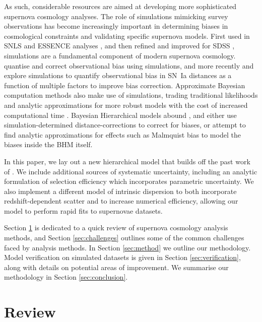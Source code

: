 \documentclass[twocolumn,trackchanges,tighten]{aastex62}
\begin{document}
As such, considerable resources are aimed at developing more sophisticated supernova cosmology analyses. The role of simulations mimicking survey observations has become increasingly important in determining biases in cosmological constraints and validating specific supernova models. First used in SNLS \citep{Astier2006} and ESSENCE analyses \citep{Wood-Vasey2007}, and then refined and improved for SDSS \citep{Kessler2009}, simulations are a fundamental component of modern supernova cosmology.  \citet{Betoule2014} quantise and correct observational bias using simulations, and more recently \citet{Scolnic2016} and \citet{Kessler2017} explore simulations to quantify observational bias in SN~Ia distances as a function of multiple factors to improve bias correction. Approximate Bayesian computation methods also make use of simulations, trading traditional likelihoods and analytic approximations for more robust models with the cost of increased computational time \citep{Weyant2013, Jennings2016}. Bayesian Hierarchical models abound \citep{Mandel2009, March2011, March2014, Rubin2015, Shariff2016, Roberts2017}, and either use simulation-determined distance-corrections to correct for biases, or attempt to find analytic approximations for effects such as Malmquist bias to model the biases inside the BHM itself.



In this paper, we lay out a new hierarchical model that builds off the past work of \citet{Rubin2015}. We include additional sources of systematic uncertainty, including an analytic formulation of selection efficiency which incorporates parametric uncertainty. We also implement a different model of intrinsic dispersion to both incorporate redshift-dependent scatter and to increase numerical efficiency, allowing our model to perform rapid fits to supernovae datasets.

Section \ref{sec:review} is dedicated to a quick review of supernova cosmology analysis methods, and Section \ref{sec:challenges} outlines some of the common challenges faced by analysis methods. In Section \ref{sec:method} we outline our methodology. Model verification on simulated datasets is given in Section \ref{sec:verification}, along with details on potential areas of improvement. We summarise our methodology in Section \ref{sec:conclusion}.



\section{Review}
\label{sec:review}
\end{document}
